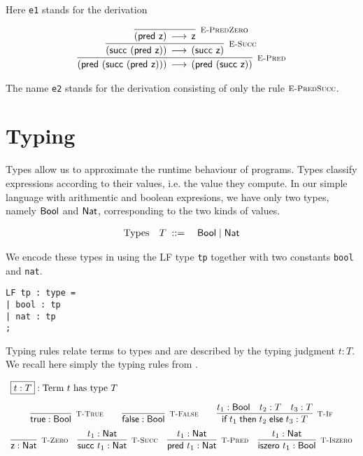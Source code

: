 Here \lstinline!e1! stands for the derivation

\[
\begin{array}{c}
\infer[\EPred]{(\tmpred {(\tmsucc {(\tmpred {\tmzero})})}) \Steps (\tmpred {(\tmsucc {\tmzero})})}
{\infer[\ESucc]{(\tmsucc {(\tmpred {\tmzero})}) \Steps (\tmsucc {\tmzero} )}
 {\infer[\EPredZ]{(\tmpred {\tmzero}) \Steps \tmzero}{}}
}
\end{array}
\]

The name \lstinline!e2! stands for the derivation consisting of only
the rule $\textsc{\footnotesize E-PredSucc}$.

\section{Typing}\label{sec:types-basic}
Types allow us to approximate the runtime behaviour of programs. Types
classify expressions according to their values, i.e. the value they
compute. In our simple language with arithmentic and boolean expresions, we have
only two types, namely $\textsf{Bool}$ and $\textsf{Nat}$, corresponding to the two
kinds of values.

\[
\begin{array}{lll}
\mbox{Types} & T \;\mathrel{::=}\; & \textsf{Bool} \mid \textsf{Nat}
\end{array}
\]

We encode these types in \beluga using the LF type \lstinline!tp! together with
two constants \lstinline!bool! and \lstinline!nat!.

\begin{lstlisting}
LF tp : type =
| bool : tp
| nat : tp
;
\end{lstlisting}

Typing rules relate terms to types and are described by the typing
judgment $t : T$. We recall here simply the typing rules from \cite{TAPL}.

\[
\begin{array}{c}
\multicolumn{1}{l}{\fbox{$t \hastype T$}: \mbox{Term $t$ has type $T$}}\\[1em]
  \infer[\TTrue]{\tmtrue \hastype \Bool}{} \qquad
  \infer[\TFalse]{\tmfalse \hastype \Bool}{} \qquad
  \infer[\TIf]{\tmif{t_1}{t_2}{t_3} \hastype T}{t_1 \hastype \Bool & t_2 \hastype T & t_3 \hastype T}
\\[0.5em]
  \infer[\TZero]{\tmzero \hastype \Nat}{}\quad
  \infer[\TSucc]{\tmsucc t_1 \hastype \Nat}{t_1 \hastype \Nat} \quad
  \infer[\TPred]{\tmpred t_1 \hastype \Nat}{t_1 \hastype \Nat} \quad
  \infer[\TIsZero]{\tmiszero t_1 \hastype \Bool}{t_1 \hastype \Nat}
\\
\end{array}
\]


